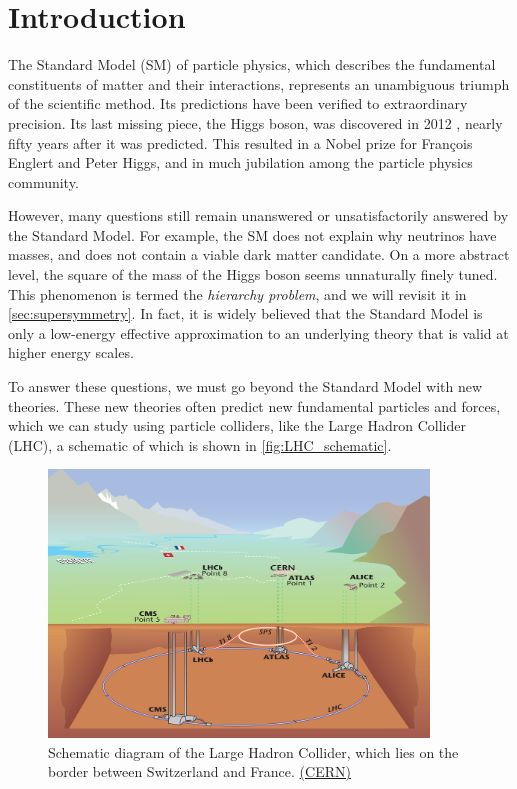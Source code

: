 \chapter{Introduction}\label{ch:introduction}
The Standard Model (SM) of particle physics, which describes the fundamental constituents of matter and their interactions, represents an unambiguous triumph of the scientific method. Its predictions have been verified to extraordinary precision. Its last missing piece, the Higgs boson, was discovered in 2012 \cite{Aad:2012tfa,Chatrchyan:2012xdj}, nearly fifty years after it was predicted. This resulted in a Nobel prize for François Englert and Peter Higgs, and in much jubilation among the particle physics community. 

However, many questions still remain unanswered or unsatisfactorily answered by the Standard Model. For example, the SM  does not explain why neutrinos have masses, and does not contain a viable dark matter candidate. On a more abstract level, the square of the mass of the Higgs boson seems unnaturally finely tuned. This phenomenon is termed the \emph{hierarchy problem}, and we will revisit it in \autoref{sec:supersymmetry}. In fact, it is widely believed that the Standard Model is only a low-energy effective approximation to an underlying theory that is valid at higher energy scales.

To answer these questions, we must go beyond the Standard Model with new theories. These new theories often predict new fundamental particles and forces, which we can study using particle colliders, like the Large Hadron Collider (LHC), a schematic of which is shown in \autoref{fig:LHC_schematic}.

\begin{figure}
  \centering
  \includegraphics[width=0.9\textwidth]{images/LHC}
  \caption{Schematic diagram of the Large Hadron Collider, which lies on the border between Switzerland and France. \href{http://cds.cern.ch/journal/CERNBulletin/2008/38/News\%20Articles/1125888?ln=en}{(CERN)}}
  \label{fig:LHC_schematic}
\end{figure}

